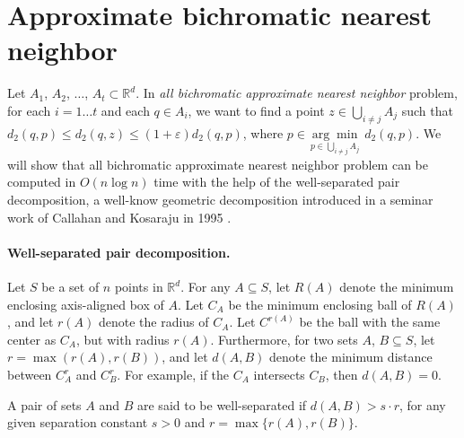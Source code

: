 \documentclass[a4paper,UKenglish,cleveref, autoref, thm-restate]{lipics-v2021}
\newcommand{\ignore}[1]{}
\begin{document}
\section*{Approximate bichromatic nearest neighbor }

Let  $A_1$, $A_2$, $\dots$, $A_t \subset \mathbb{R}^d$. In {\it all bichromatic approximate nearest neighbor} problem, for each $i = 1 \dots t$ and each $q \in A_i$, we want to find 
a point $ z \in \bigcup \limits_{i \neq j} A_j$ such that $d_2(q,p)\le d_2(q,z) \le (1+\varepsilon) d_2(q, p)$, where 
$
	p \in \underset{{p \in \bigcup \limits_{i \neq j} A_j}}{\arg \min }\;  d_2 \left(q, p\right).
$
We will show that all bichromatic approximate nearest neighbor problem can be computed in $O(n\log n)$ time with the 
help of the well-separated pair decomposition, a well-know geometric decomposition introduced in a seminar work of 
Callahan and Kosaraju in 1995 \cite{callahan95-phd, callahan95}.

\paragraph{Well-separated pair decomposition.} Let $S$ be a set of $n$ points in $\mathbb{R}^d$. For any $A \subseteq S$, let $R(A)$ denote the minimum enclosing axis-aligned box of $A$.  Let $C_A$ be the minimum enclosing ball of $R(A)$, and let 
$r(A)$ denote the radius of $C_A$.  Let $C^{r(A)}$ be the ball with the same center as 
$C_A$, but with radius $r(A)$.  Furthermore, for two sets $A$, $B \subseteq S$, let $r = \max(r(A), r(B))$, and let $d(A, B)$ denote the minimum distance between $C^{r}_A$ and $C^{r}_B$.  For example, if the $C_A$ intersects $C_B$, then $d(A,B) = 0$.

\begin{definition}
A pair of sets $A$ and $B$ are said to be well-separated if $d(A, B) > s \cdot r$, for 
any given separation constant $s>0$ and $r = \max\{r(A), r(B)\}$. 
\end{definition}

\ignore{
\begin{figure}
  \centering
  \texttt{[image: figures/dumbell.png]} 
  \caption{An example of a dumbbell for a pair of sets $(A, B)$. }
  \label{fig:fig1}
\end{figure}
}%
 
\end{document}
